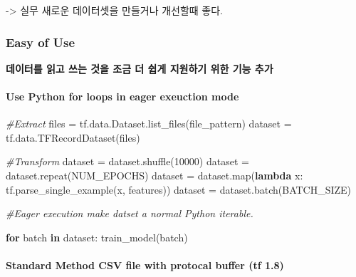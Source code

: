 \documentclass[11pt]{article}
\newenvironment{Shaded}{}{}
\newcommand{\KeywordTok}[1]{\textcolor[rgb]{0.00,0.44,0.13}{\textbf{{#1}}}}
\newcommand{\DecValTok}[1]{\textcolor[rgb]{0.25,0.63,0.44}{{#1}}}
\newcommand{\CommentTok}[1]{\textcolor[rgb]{0.38,0.63,0.69}{\textit{{#1}}}}
\newcommand{\NormalTok}[1]{{#1}}
\newcommand{\ControlFlowTok}[1]{\textcolor[rgb]{0.00,0.44,0.13}{\textbf{{#1}}}}
\newcommand{\OperatorTok}[1]{\textcolor[rgb]{0.40,0.40,0.40}{{#1}}}
\newcommand{\BuiltInTok}[1]{{#1}}
\begin{document}
-\textgreater{} 실무 새로운 데이터셋을 만들거나 개선할때 좋다.

    \hypertarget{easy-of-use}{%
\subsubsection{Easy of Use}\label{easy-of-use}}

\textbf{데이터를 읽고 쓰는 것을 조금 더 쉽게 지원하기 위한 기능 추가}

\hypertarget{use-python-for-loops-in-eager-exeuction-mode}{%
\paragraph{Use Python for loops in eager exeuction
mode}\label{use-python-for-loops-in-eager-exeuction-mode}}

\begin{Shaded}
\begin{Highlighting}[]
\CommentTok{#Extract}
\NormalTok{files }\OperatorTok{=}\NormalTok{ tf.data.Dataset.list_files(file_pattern)}
\NormalTok{dataset }\OperatorTok{=}\NormalTok{ tf.data.TFRecordDataset(files)}

\CommentTok{#Transform}
\NormalTok{dataset }\OperatorTok{=}\NormalTok{ dataset.shuffle(}\DecValTok{10000}\NormalTok{)}
\NormalTok{dataset }\OperatorTok{=}\NormalTok{ dataset.repeat(NUM_EPOCHS)}
\NormalTok{dataset }\OperatorTok{=}\NormalTok{ dataset.}\BuiltInTok{map}\NormalTok{(}\KeywordTok{lambda}\NormalTok{ x: tf.parse_single_example(x, features))}
\NormalTok{dataset }\OperatorTok{=}\NormalTok{ dataset.batch(BATCH_SIZE)}

\CommentTok{#Eager execution make datset a normal Python iterable.}

\ControlFlowTok{for}\NormalTok{ batch }\KeywordTok{in}\NormalTok{ dataset:}
\NormalTok{    train_model(batch)}
\end{Highlighting}
\end{Shaded}

\hypertarget{standard-method-csv-file-with-protocal-buffer-tf-1.8}{%
\paragraph{Standard Method CSV file with protocal buffer (tf
1.8)}\label{standard-method-csv-file-with-protocal-buffer-tf-1.8}}
\end{document}
